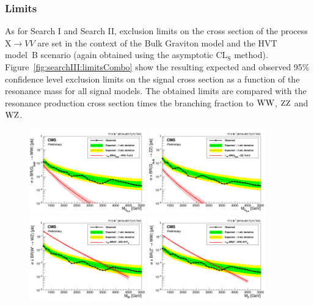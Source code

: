 \subsubsection{Limits}
As for Search I and Search II, exclusion limits on the cross section of the process $\text{X} \to VV$ are set in the context of the Bulk Graviton model and the HVT model~B scenario (again obtained using the asymptotic $\text{CL}_\text{S}$ method). Figure~\ref{fig:searchIII:limitsCombo} show the resulting expected and observed 95\% confidence level exclusion limits on the signal cross section as a function of the resonance mass for all signal models. The obtained limits are compared with the resonance production cross section times the branching fraction to $\mathrm{W}\mathrm{W}$, $\mathrm{Z}\mathrm{Z}$ and $\mathrm{W}\mathrm{Z}$.
\begin{figure}[h!]
\centering
\includegraphics[width=0.45\textwidth]{figures/analysis/search3/AN-17-303/limits/limits_BulkGWW_combo_2016_2017.png}
\includegraphics[width=0.45\textwidth]{figures/analysis/search3/AN-17-303/limits/limits_BulkGZZ_combo_2016_2017.png}\\
\includegraphics[width=0.45\textwidth]{figures/analysis/search3/AN-17-303/limits/limits_WprimeWZ_combo_2016_2017.png}
\includegraphics[width=0.45\textwidth]{figures/analysis/search3/AN-17-303/limits/limits_ZprimeWW_combo_2016_2017.png}

\end{figure}
